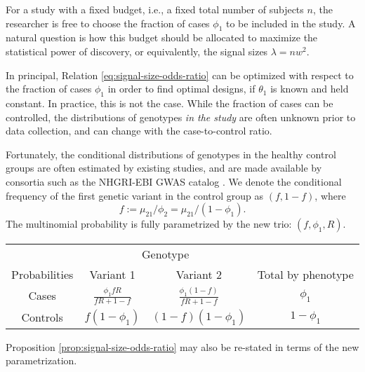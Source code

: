 For a study with a fixed budget, i.e., a fixed total number of subjects $n$, the researcher is free to choose the fraction of cases $\phi_1$ to be included in the study.
A natural question is how this budget should be allocated to maximize the statistical power of discovery, or equivalently, the signal sizes $\lambda=nw^2$.

In principal, Relation \eqref{eq:signal-size-odds-ratio} can be optimized with respect to the fraction of cases $\phi_1$ in order to find optimal designs, if $\theta_1$ is known and held constant.
In practice, this is not the case.
While the fraction of cases can be controlled, the distributions of genotypes \emph{in the study} are often unknown prior to data collection, and can change with the case-to-control ratio.

Fortunately, the conditional distributions of genotypes in the healthy control groups are often estimated by existing studies, and are made available by consortia such as the NHGRI-EBI GWAS catalog \citep{macarthur2016new}.
We denote the conditional frequency of the first genetic variant in the control group as $(f, 1-f)$, where
\begin{equation} \label{eq:RAF}
    f := \mu_{21} / \phi_2 = \mu_{21}/ (1-\phi_1).
\end{equation}
The multinomial probability is fully parametrized by the new trio: $(f, \phi_1, R)$.
\begin{center}
    \begin{tabular}{cccc}
    \hline
    & \multicolumn{2}{c}{Genotype} \\
    \cline{2-3}
    Probabilities & Variant 1 & Variant 2 & Total by phenotype \\
    \hline
    Cases & $\frac{\phi_1fR}{fR+1-f}$ & $\frac{\phi_1(1-f)}{fR+1-f}$ & $\phi_1$ \\
    Controls & $f(1-\phi_1)$ & $(1-f)(1-\phi_1)$ & $1-\phi_1$ \\
    \hline
    \end{tabular}
\end{center}
Proposition \ref{prop:signal-size-odds-ratio} may also be re-stated in terms of the new parametrization.


